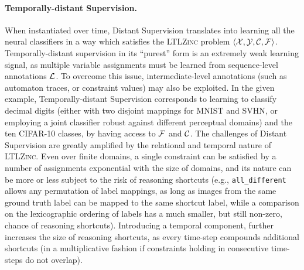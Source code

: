 \paragraph{Temporally-distant Supervision.}
When instantiated over time, Distant Supervision translates into learning all the neural classifiers in a way which satisfies the \textsc{LTLZinc} problem $\langle{\mathcal{X}}, {\mathcal{Y}}, {\mathcal{C}}, {\mathcal{F}}\rangle$.
Temporally-distant supervision in its ``purest'' form is an extremely weak learning signal, as multiple variable assignments must be learned from sequence-level annotations ${\mathcal{L}}$. To overcome this issue, intermediate-level annotations (such as automaton traces, or constraint values) may also be exploited.
In the given example, Temporally-distant Supervision corresponds to learning to classify decimal digits (either with two disjoint mappings for MNIST and SVHN, or employing a joint classifier robust against different perceptual domains) and the ten CIFAR-10 classes, by having access to ${\mathcal{F}}$ and ${\mathcal{C}}$.
The challenges of Distant Supervision are greatly amplified by the relational and temporal nature of \textsc{LTLZinc}.
Even over finite domains, a single constraint can be satisfied by a number of assignments exponential with the size of domains, and its nature can be more or less subject to the risk of reasoning shortcuts (e.g., \texttt{all\_different} allows any permutation of label mappings, as long as images from the same ground truth label can be mapped to the same shortcut label, while a comparison on the lexicographic ordering of labels has a much smaller, but still non-zero, chance of reasoning shortcuts).
Introducing a temporal component, further increases the size of reasoning shortcuts, as every time-step compounds additional shortcuts (in a multiplicative fashion if constraints holding in consecutive time-steps do not overlap).

